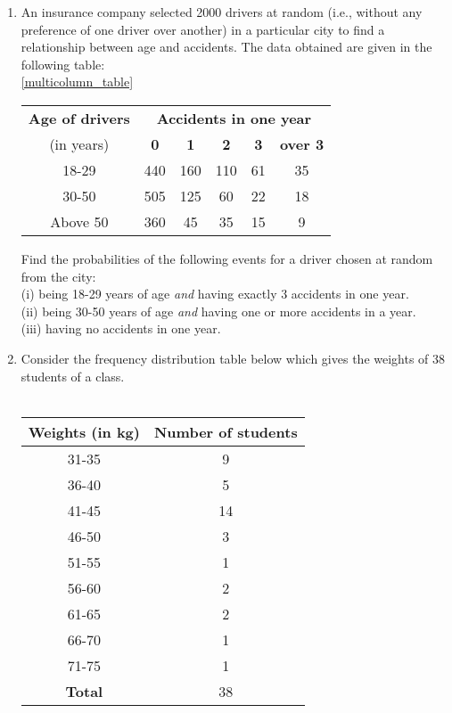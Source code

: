 \begin{enumerate}[label=\arabic*.,ref=\thesubsection.\theenumi]
Based on this data, find the probability that the student gets more than 70$\%$ marks in a unit test.\\
\item An insurance company selected 2000 drivers at random (i.e., without
any preference of one driver over another) in a particular city to find a relationship between age and accidents. The data obtained are given in the following table:\\
\ref{multicolumn_table}
\begin{table}
\centering
\begin{tabular}{|c|c|c|c|c|c|}
\hline
\textbf{Age of drivers} &\multicolumn{5}{c|}{\textbf{Accidents in one year }}\\
\cline{2-6}
(in years) &\textbf{0} &\textbf{1} &\textbf{2} &\textbf{3} &\textbf{over 3}\\
\hline
18-29 &440 &160 &110 &61 &35\\
\hline
30-50 &505 &125 &60 &22 &18\\
\hline
Above 50 &360 &45 &35 &15 &9\\
\hline
\end{tabular}

\end{table}

Find the probabilities of the following events for a driver chosen at random from the city:\\
(i) being 18-29 years of age \textit{and} having exactly 3 accidents in one year.\\
(ii) being 30-50 years of age \textit{and} having one or more accidents in a year.\\
(iii) having no accidents in one year.\\

\item Consider the frequency distribution table below which gives the weights of 38 students of a class.\\
\\
\begin{tabular}{ |c|c| } 
 \hline
 \textbf{Weights (in kg)} &\textbf{Number of students }\\ 
 \hline
 31-35 &9\\
 36-40 &5\\
 41-45 &14\\
 46-50 &3\\
 51-55 &1\\
 56-60 &2\\
 61-65 &2\\
 66-70 &1\\
 71-75 &1\\
 \hline
 \textbf{Total} &38\\
 \hline
\end{tabular}\\


\end{enumerate}
